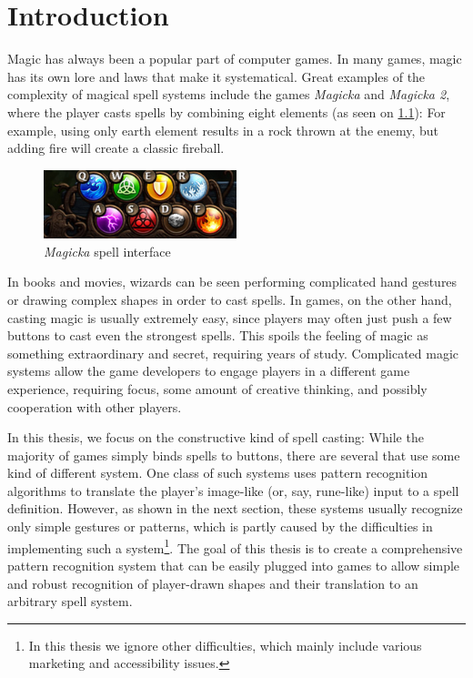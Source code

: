 
\chapter{Introduction}
Magic has always been a popular part of computer games. In many games, magic has its own lore and laws that make it systematical. Great examples of the complexity of magical spell systems include the games \emph{Magicka} and \emph{Magicka 2}, where the player casts spells by combining eight elements (as seen on \cref{fig:magicka}): For example, using only earth element results in a rock thrown at the enemy, but adding fire will create a classic fireball.

\begin{figure}
  \centering
  \includegraphics[width=0.5\textwidth]{ext/magicka.png}
  \caption{\emph{Magicka} spell interface}
  \label{fig:magicka}
\end{figure}

In books and movies, wizards can be seen performing complicated hand gestures or drawing complex shapes in order to cast spells. In games, on the other hand, casting magic is usually extremely easy, since players may often just push a few buttons to cast even the strongest spells. This spoils the feeling of magic as something extraordinary and secret, requiring years of study. Complicated magic systems allow the game developers to engage players in a different game experience, requiring focus, some amount of creative thinking, and possibly cooperation with other players.

In this thesis, we focus on the constructive kind of spell casting: While the majority of games simply binds spells to buttons, there are several that use some kind of different system. One class of such systems uses pattern recognition algorithms to translate the player's image-like (or, say, rune-like) input to a spell definition. However, as shown in the next section, these systems usually recognize only simple gestures or patterns, which is partly caused by the difficulties in implementing such a system\footnote{In this thesis we ignore other difficulties, which mainly include various marketing and accessibility issues.}. The goal of this thesis is to create a comprehensive pattern recognition system that can be easily plugged into games to allow simple and robust recognition of player-drawn shapes and their translation to an arbitrary spell system.

